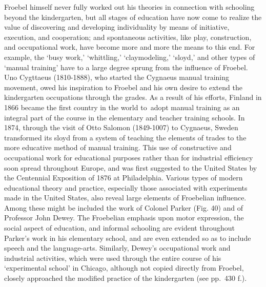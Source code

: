 \documentclass[]{book}
\begin{document}
Froebel himself never fully worked out his theories in connection with schooling beyond the kindergarten, but all stages of education have now come to realize the value of discovering and developing individuality by means of initiative, execution, and cooperation; and spontaneous activities, like play, construction, and occupational work, have become more and more the means to this end. For example, the `busy work,' `whittling,' `claymodeling,' `sloyd,' and other types of `manual training' have to a large degree sprung from the influence of Froebel. Uno Cygttaeus (1810-1888), who started the Cygnaeus manual training movement, owed his inspiration to Froebel and his own desire to extend the kindergarten occupations through the grades. As a result of his efforts, Finland in 1866 became the first country in the world to~adopt manual training as an integral part of the course in the elementary and teacher training schools. In 1874, through the visit of Otto Salomon (1849-1007) to Cygnaeus, Sweden transformed its sloyd from a system of teaching the elements of trades to the more educative method of manual training. This use of constructive and occupational work for educational purposes rather than for industrial efficiency soon spread throughout Europe, and was first suggested to the United States by the Centennial Exposition of 1876 at Philadelphia. Various types of modern educational theory and practice, especially those associated with experiments made in the United States, also reveal large elements of Froebelian influence. Among these might be included the work of Colonel Parker (Fig. 40) and of Professor John Dewey. The Froebelian emphasis upon motor expression, the social aspect of education, and informal schooling are evident throughout Parker's work in his elementary school, and are even extended so as to include speech and the language-arts. Similarly, Dewey's occupational work and industrial activities, which were used through the entire course of his `experimental school' in Chicago, although not copied directly from Froebel, closely approached the modified practice of the kindergarten (see pp.~430 f.).
\end{document}
